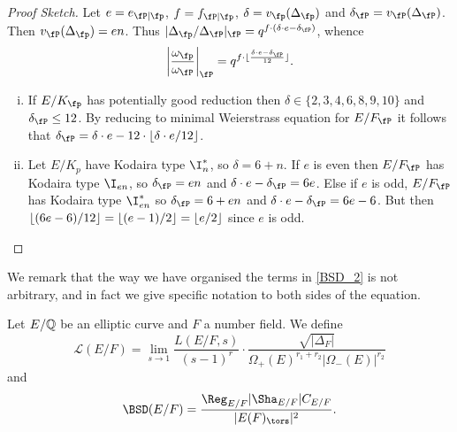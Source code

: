 \begin{proof}[Proof Sketch]
Let $e = e_{\fP \mid \fp}$, $f = f_{\fP \mid \fp}$, $\delta = v_{\fp}(\Delta_{\fp})$ and $\delta_{\fP} = v_{\fP}(\Delta_{\fP})$. Then $v_{\fP}(\Delta_{\fp}) = e n$. Thus $|\Delta_{\fp} / \Delta_{\fP} |_{\fP} = q^{f\cdot (\delta \cdot e - \delta_{\fP})}$, whence $$\left| \frac{\omega_{\fp}}{\omega_{\fP}}\right|_{\fP} = q^{f \cdot \floor{\frac{\delta \cdot e - \delta_{\fP}}{12}}}.$$ 
\begin{enumerate}[(i)]
    \setlength\itemsep{0em}
    \setcounter{enumi}{1}
    \item If $E / K_{\fp}$ has potentially good reduction then $\delta \in \{ 2,3,4,6,8,9,10 \}$ and $\delta_{\fP} \leq 12$. By reducing to minimal Weierstrass equation for $E / F_{\fP}$ it follows that $\delta_{\fP} = \delta\cdot e - 12 \cdot \floor{\delta\cdot e / 12}$.
    
    \item Let $E / K_p$ have Kodaira type $\I_n^*$, so $\delta = 6 + n$. If $e$ is even then $E / F_{\fP}$ has Kodaira type $\I_{en}$, so $\delta_{\fP} = en$ and $\delta \cdot e - \delta_{\fP} = 6 e$.
    Else if $e$ is odd, $E / F_{\fP}$ has Kodaira type $\I_{en}^*$ so $\delta_{\fP} = 6 + en$ and $\delta\cdot e - \delta_{\fP} = 6 e - 6$. But then $\lfloor(6e - 6)/12\rfloor = \lfloor(e - 1)/2\rfloor = \lfloor e / 2\rfloor$ since $e$ is odd.
\end{enumerate}
\end{proof}


We remark that the way we have organised the terms in \eqref{BSD_2} is not arbitrary, and in fact we give specific notation to both sides of the equation. 

\begin{notation}
    Let $E/\mathbb{Q}$ be an elliptic curve and $F$ a number field. We define 
    $$\mathcal{L}(E/F)=\lim_{s\to1}\frac{L(E/F,s)}{(s-1)^r}\cdot\frac{\sqrt{|\Delta_F|}}{\Omega_+(E)^{r_1+r_2}|\Omega_-(E)|^{r_2}}$$
    and
    $$\BSD(E/F)=\frac{\Reg_{E/F}|\Sha_{E/F}|C_{E/F}}{|E(F)_{\tors}|^2}.$$
\end{notation}


